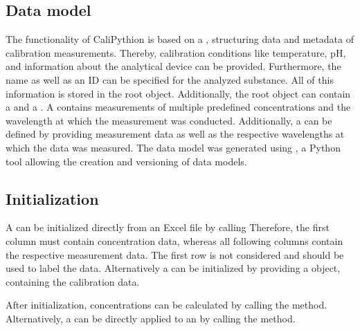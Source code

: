 \documentclass[letterpaper,12pt,english]{jupyterBook}
\begin{document}
\subsection{Data model}
\label{\detokenize{methods:data-model}}\label{\detokenize{methods:calipytion-datamodel}}
\sphinxAtStartPar
The  functionality of CaliPythion is based on a , structuring data and metadata of calibration measurements. Thereby, calibration conditions like temperature, pH, and information about the analytical device can be provided. Furthermore, the name as well as an ID can be specified for the analyzed substance. All of this information is stored in the  root object. Additionally, the root object can contain a  and a . A  contains measurements of multiple predefined concentrations and the wavelength at which the measurement was conducted. Additionally, a  can be defined by providing measurement data as well as the respective wavelengths at which the data was measured. The data model was generated using , a Python tool allowing the creation and versioning of data models.


\subsection{Initialization}
\label{\detokenize{methods:initialization}}
\sphinxAtStartPar
A  can be initialized directly from an Excel file by calling 
Therefore, the first column must contain concentration data, whereas all following columns contain the respective measurement data. The first row is not considered and should be used to label the data.
Alternatively a  can be initialized by providing a  object, containing the calibration data.

\sphinxAtStartPar
After  initialization, concentrations can be calculated by calling the  method. Alternatively, a  can be directly applied to an  by calling the  method.
\end{document}
